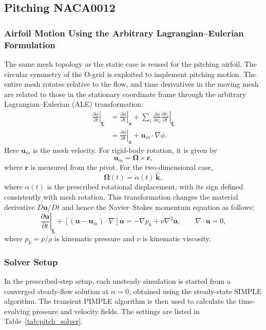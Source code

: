 \FloatBarrier
\subsection{Pitching NACA0012}
\subsubsection{Airfoil Motion Using the Arbitrary Lagrangian--Eulerian Formulation}
The same mesh topology as the static case is reused for the pitching airfoil. The circular symmetry of the O-grid is exploited to implement pitching motion. The entire mesh rotates relative to the flow, and time derivatives in the moving mesh are related to those in the stationary coordinate frame through the arbitrary Lagrangian--Eulerian (ALE) transformation:
\begin{align}
\left.\frac{\partial\phi}{\partial t}\right|_{\boldsymbol\xi}
&=\left.\frac{\partial\phi}{\partial t}\right|_{\mathbf{x}}
+\sum_i\frac{\partial\phi}{\partial x_i}
\left.\frac{\partial x_i}{\partial t}\right|_{\boldsymbol\xi}\\
&=\left.\frac{\partial\phi}{\partial t}\right|_{\mathbf{x}}
+\mathbf{u}_m\cdot\nabla\phi.
\end{align}
Here $\mathbf{u}_m$ is the mesh velocity. For rigid-body rotation, it is given by
\begin{equation}
\mathbf{u}_m=\boldsymbol\Omega\times\mathbf{r},
\end{equation}
where $\mathbf{r}$ is measured from the pivot. For the two-dimensional case,
\begin{equation}
\boldsymbol\Omega(t)=\dot\alpha(t)\,\hat{\mathbf{k}},
\end{equation}
where $\alpha(t)$ is the prescribed rotational displacement, with its sign defined consistently with mesh rotation. This transformation changes the material derivative $D\mathbf{u}/Dt$ and hence the Navier--Stokes momentum equation as follows:
\begin{equation}
\left.\frac{\partial\mathbf{u}}{\partial t}\right|_{\boldsymbol\xi}
+[(\mathbf{u}-\mathbf{u}_m)\cdot\nabla]\mathbf{u}
=-\nabla p_k+\nu\nabla^2\mathbf{u},
\qquad \nabla\cdot\mathbf{u}=0,
\end{equation}
where $p_k=p/\rho$ is kinematic pressure and $\nu$ is kinematic viscosity.

\subsubsection{Solver Setup}
In the prescribed-step setup, each unsteady simulation is started from a converged steady-flow solution at $\alpha=0$, obtained using the steady-state SIMPLE algorithm. The transient PIMPLE algorithm is then used to calculate the time-evolving pressure and velocity fields. The settings are listed in Table~\ref{tab:pitch_solver}.


